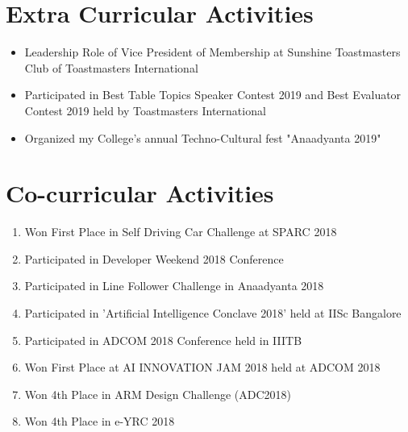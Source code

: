 \documentclass[12pt,a4paper,sans]{moderncv} %
\begin{document}

\section{Extra Curricular Activities}

\begin{itemize}
	\item Leadership Role of Vice President of Membership at Sunshine Toastmasters Club of Toastmasters International
	\item Participated in Best Table Topics Speaker Contest 2019 and Best Evaluator Contest 2019 held by Toastmasters International
	\item Organized my College's annual Techno-Cultural fest "Anaadyanta 2019" 
\end{itemize}

\hfill
\hfill
\hfill
\hfill
\hfill
\break
\section{Co-curricular Activities}

\begin{enumerate}
	\item Won First Place in Self Driving Car Challenge at SPARC 2018
	\item Participated in Developer Weekend 2018 Conference
	\item Participated in Line Follower Challenge in Anaadyanta 2018
	\item Participated in 'Artificial Intelligence Conclave 2018' held at IISc Bangalore
	\item Participated in ADCOM 2018 Conference held in IIITB
	\item Won First Place at AI INNOVATION JAM 2018 held at ADCOM 2018
	\item Won 4th Place in ARM Design Challenge (ADC2018)
	\item Won 4th Place in e-YRC 2018 
	
\end{enumerate}

\end{document}
